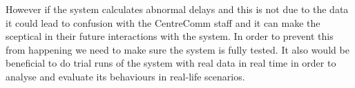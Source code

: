 However if the system calculates abnormal delays and this is not due to the data it could lead to confusion with the CentreComm staff and it can make the sceptical in their future interactions with the system. In order to prevent this from happening we need to make sure the system is fully tested. It also would be beneficial to do trial runs of the system with real data in real time in order to analyse and evaluate its behaviours in real-life scenarios.

